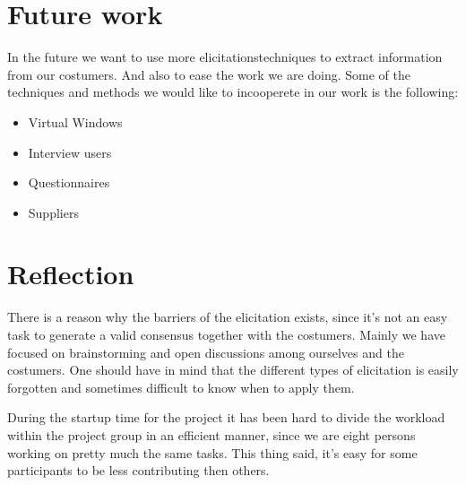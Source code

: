 \documentclass[a4paper]{article}
\begin{document}
  \section{Future work}

  In the future we want to use more elicitationstechniques to extract information from our costumers. And also to ease the work we are doing.
  Some of the techniques and methods we would like to incooperete in our work is the following:
  \begin{itemize}
  	\item Virtual Windows
  	\item Interview users
  	\item Questionnaires
  	\item Suppliers 
  \end{itemize}
 
  \section{Reflection}



	There is a reason why the barriers of the elicitation exists, since it's not an easy task to generate a valid consensus together with the costumers.
	Mainly we have focused on brainstorming and open discussions among ourselves and the costumers. One should have in mind that the different types of elicitation is easily forgotten and sometimes difficult to know when to apply them.
  
 	During the startup time for the project it has been hard to divide the workload within the project group in an efficient manner, since we are eight persons working on pretty much the same tasks. This thing said, it's easy for some participants to be less contributing then others.
\end{document}
